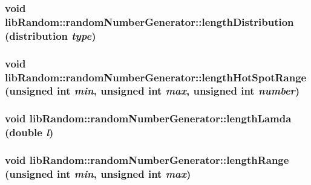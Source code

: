 \begin{CompactItemize}
\hypertarget{classlibRandom_1_1randomNumberGenerator_5167967f2fef78e42b6cf203520accaa}{
\subsubsection[{lengthDistribution}]{\setlength{\rightskip}{0pt plus 5cm}void libRandom::randomNumberGenerator::lengthDistribution ({\bf distribution} {\em type})}}
\label{classlibRandom_1_1randomNumberGenerator_5167967f2fef78e42b6cf203520accaa}


\hypertarget{classlibRandom_1_1randomNumberGenerator_37e8d447168cfeb82a0256ea69dfdd26}{
\subsubsection[{lengthHotSpotRange}]{\setlength{\rightskip}{0pt plus 5cm}void libRandom::randomNumberGenerator::lengthHotSpotRange (unsigned int {\em min}, \/  unsigned int {\em max}, \/  unsigned int {\em number})}}
\label{classlibRandom_1_1randomNumberGenerator_37e8d447168cfeb82a0256ea69dfdd26}


\hypertarget{classlibRandom_1_1randomNumberGenerator_6d64b08e866628293422187ee4c91ce5}{
\subsubsection[{lengthLamda}]{\setlength{\rightskip}{0pt plus 5cm}void libRandom::randomNumberGenerator::lengthLamda (double {\em l})}}
\label{classlibRandom_1_1randomNumberGenerator_6d64b08e866628293422187ee4c91ce5}


\hypertarget{classlibRandom_1_1randomNumberGenerator_89781d80f95a9dee3cba6e0833b711f5}{
\subsubsection[{lengthRange}]{\setlength{\rightskip}{0pt plus 5cm}void libRandom::randomNumberGenerator::lengthRange (unsigned int {\em min}, \/  unsigned int {\em max})}}
\label{classlibRandom_1_1randomNumberGenerator_89781d80f95a9dee3cba6e0833b711f5}



\end{CompactItemize}
